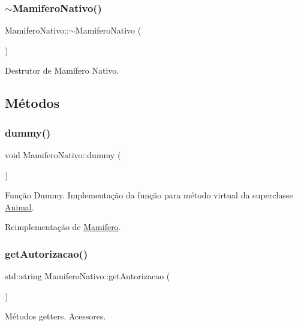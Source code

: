 \subsubsection{\texorpdfstring{$\sim$\+Mamifero\+Nativo()}{~MamiferoNativo()}}
{\footnotesize\ttfamily Mamifero\+Nativo\+::$\sim$\+Mamifero\+Nativo (\begin{DoxyParamCaption}{ }\end{DoxyParamCaption})}

Destrutor de Mamífero Nativo. 

\subsection{Métodos}
\mbox{\label{classMamiferoNativo_a79092135d515ffb00c24dcc8bc073acc}} 
\subsubsection{\texorpdfstring{dummy()}{dummy()}}
{\footnotesize\ttfamily void Mamifero\+Nativo\+::dummy (\begin{DoxyParamCaption}{ }\end{DoxyParamCaption})\hspace{0.3cm}{\ttfamily [virtual]}}

Função Dummy. Implementação da função para método virtual da superclasse \hyperlink{classAnimal}{Animal}. 

Reimplementação de \hyperlink{classMamifero_a8f2a488b1796d3ccf0ff9e1c5a82af05}{Mamifero}.

\mbox{\label{classMamiferoNativo_aefe966dd3616bfbc201131eaf711b9eb}} 
\subsubsection{\texorpdfstring{get\+Autorizacao()}{getAutorizacao()}}
{\footnotesize\ttfamily std\+::string Mamifero\+Nativo\+::get\+Autorizacao (\begin{DoxyParamCaption}{ }\end{DoxyParamCaption})}

Métodos getters. Acessores. \mbox{\label{classMamiferoNativo_a9435be8d270a3f066bd873bbb3066753}} 
